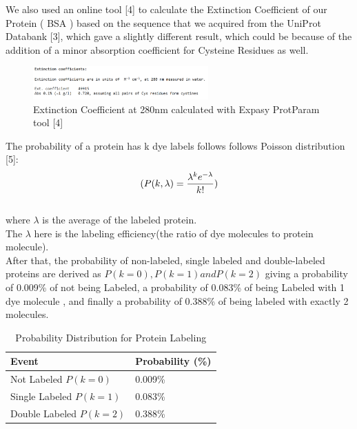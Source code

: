 \documentclass[a4paper,english,12pt,bibliography=totoc]{scrreprt}
\begin{document}
We also used an online tool [4]  to calculate the Extinction Coefficient of our Protein ( BSA ) based on the sequence that we acquired from the UniProt Databank [3], which gave a slightly different result, which could be because of the addition of a minor absorption coefficient for Cysteine Residues as well.

\begin{figure}[H]
    \centering
    \includegraphics[width=0.6\textwidth]{extinctioncoefficient.png}
    \caption{Extinction Coefficient at 280nm calculated with Expasy ProtParam tool [4]}
    \label{fig:ViolinPlot}
\end{figure}

The probability of a protein has k dye labels follows follows Poisson distribution [5]:\\
\begin{equation}
    (P(k,\lambda) = \frac{\lambda^k e^{-\lambda}}{k!})\\
\end{equation}
\\
where $\lambda$ is the average of the labeled protein.
\\
The $\lambda$ here is the labeling efficiency(the ratio of dye molecules to protein molecule).\\



After that, the probability of non-labeled, single labeled and double-labeled proteins are derived as $P(k = 0), P(k = 1) and P( k = 2)$ giving a probability of 0.009\% of not being Labeled, a probability of 0.083\% of being Labeled with 1 dye molecule , and finally a probability of 0.388\% of being labeled with exactly 2 molecules.\\
\begin{table}[h]
    \centering
    \begin{tabular}{l|l}
        \toprule
        \textbf{Event} & \textbf{Probability (\%)} \\
        \midrule
        Not Labeled $P(k = 0)$ & 0.009\% \\
        Single Labeled $P(k = 1)$ & 0.083\% \\
        Double Labeled $P(k = 2)$ & 0.388\% \\
        \bottomrule
    \end{tabular}
    \caption{Probability Distribution for Protein Labeling}
    \label{tab:protein_labeling}
\end{table}
\end{document}
